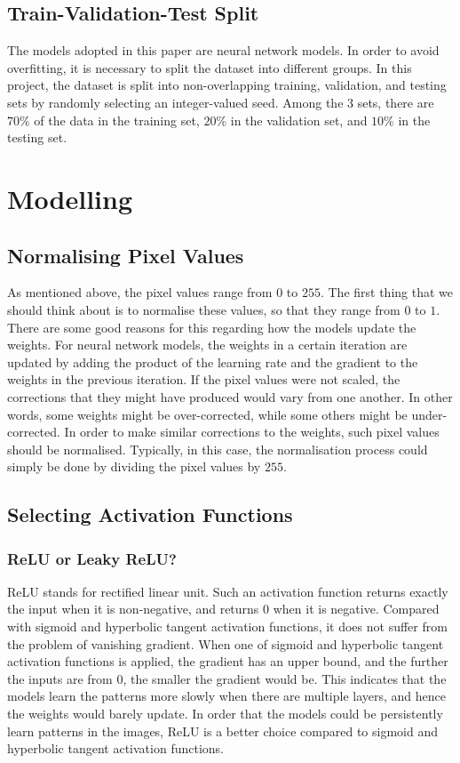 \documentclass[11pt,twoside]{article}
\numberwithin{Theorem}{section}
\numberwithin{Definition}{section}
\numberwithin{Lemma}{section}
\numberwithin{Algorithm}{section}
\numberwithin{equation}{section}
\begin{document}
\subsection{Train-Validation-Test Split}
The models adopted in this paper are neural network models. In order to avoid overfitting, it is necessary to split the dataset into different groups. In this project, the dataset is split into non-overlapping training, validation, and testing sets by randomly selecting an integer-valued seed. Among the $3$ sets, there are $70\%$ of the data in the training set, $20\%$ in the validation set, and $10\%$ in the testing set.

\section{Modelling}
\subsection{Normalising Pixel Values}
As mentioned above, the pixel values range from $0$ to $255$. The first thing that we should think about is to normalise these values, so that they range from $0$ to $1$. There are some good reasons for this regarding how the models update the weights. For neural network models, the weights in a certain iteration are updated by adding the product of the learning rate and the gradient to the weights in the previous iteration. If the pixel values were not scaled, the corrections that they might have produced would vary from one another. In other words, some weights might be over-corrected, while some others might be under-corrected. In order to make similar corrections to the weights, such pixel values should be normalised. Typically, in this case, the normalisation process could simply be done by dividing the pixel values by $255$.

\subsection{Selecting Activation Functions}
\subsubsection{ReLU or Leaky ReLU?}
ReLU stands for rectified linear unit. Such an activation function returns exactly the input when it is non-negative, and returns $0$ when it is negative. Compared with sigmoid and hyperbolic tangent activation functions, it does not suffer from the problem of vanishing gradient. When one of sigmoid and hyperbolic tangent activation functions is applied, the gradient has an upper bound, and the further the inputs are from $0$, the smaller the gradient would be. This indicates that the models learn the patterns more slowly when there are multiple layers, and hence the weights would barely update. In order that the models could be persistently learn patterns in the images, ReLU is a better choice compared to sigmoid and hyperbolic tangent activation functions.
\end{document}
